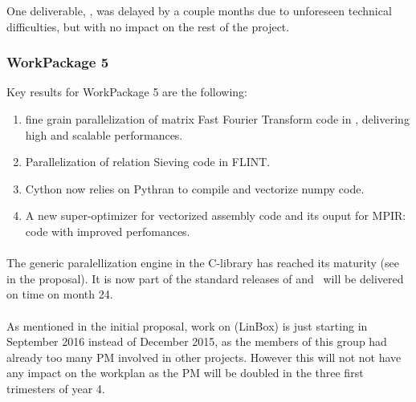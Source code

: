 \documentclass{deliverablereport}
\begin{document}
  One deliverable, , was delayed by a couple months due to
  unforeseen technical difficulties, but with no impact on the rest of the project.


  \subsubsection{WorkPackage 5}
  Key results for WorkPackage 5 are the following:
  \begin{enumerate}
  \item fine grain parallelization of matrix Fast Fourier Transform code in
    \FLINT, delivering high and scalable performances.
  \item Parallelization of  relation  Sieving code in FLINT.
  \item Cython now relies on Pythran to compile and vectorize numpy code.
  \item A new super-optimizer for vectorized assembly code and its ouput for
    MPIR: code with improved perfomances.
  \end{enumerate}

\paragraph{}
The generic paralellization engine in the \Pari C-library
  has reached its maturity (see~ in the proposal).
  It is now part of the standard releases of \Pari and~
  will be delivered on time on month 24.

\paragraph{}

\paragraph{}
As mentioned in the initial proposal, work on  (LinBox) is just
  starting in September 2016 instead of December 2015, as the members of this group had
  already too many PM involved in other projects. However this will not not have any
  impact on the workplan as the PM will be doubled in the three first trimesters of year
  4.
\end{document}
